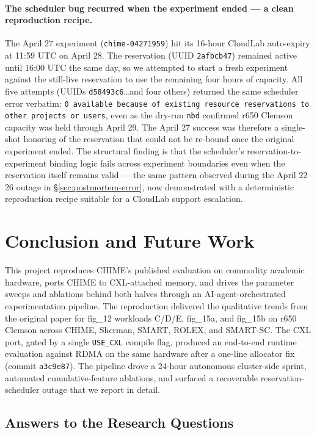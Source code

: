 \documentclass[11pt,a4paper]{article}
\begin{document}
\paragraph{The scheduler bug recurred when the experiment ended --- a clean reproduction recipe.} The April 27 experiment (\texttt{chime-04271959}) hit its 16-hour CloudLab auto-expiry at 11:59 UTC on April 28. The reservation (UUID \texttt{2afbcb47}) remained active until 16:00 UTC the same day, so we attempted to start a fresh experiment against the still-live reservation to use the remaining four hours of capacity. All five attempts (UUIDs \texttt{d58493c6}\ldots and four others) returned the same scheduler error verbatim: \texttt{0 available because of existing resource reservations to other projects or users}, even as the dry-run \texttt{nbd} confirmed r650 Clemson capacity was held through April 29. The April 27 success was therefore a single-shot honoring of the reservation that could not be re-bound once the original experiment ended. The structural finding is that the scheduler's reservation-to-experiment binding logic fails across experiment boundaries even when the reservation itself remains valid --- the same pattern observed during the April 22--26 outage in §\ref{sec:postmortem-error}, now demonstrated with a deterministic reproduction recipe suitable for a CloudLab support escalation.

\section{Conclusion and Future Work}
\label{sec:conclusion}

This project reproduces CHIME's published evaluation on commodity academic hardware, ports CHIME to CXL-attached memory, and drives the parameter sweeps and ablations behind both halves through an AI-agent-orchestrated experimentation pipeline. The reproduction delivered the qualitative trends from the original paper for fig\_12 workloads C/D/E, fig\_15a, and fig\_15b on r650 Clemson across CHIME, Sherman, SMART, ROLEX, and SMART-SC. The CXL port, gated by a single \texttt{USE\_CXL} compile flag, produced an end-to-end runtime evaluation against RDMA on the same hardware after a one-line allocator fix (commit \texttt{a3c9e87}). The pipeline drove a 24-hour autonomous cluster-side sprint, automated cumulative-feature ablations, and surfaced a recoverable reservation-scheduler outage that we report in detail.

\subsection{Answers to the Research Questions}
\label{sec:answers}
\end{document}
